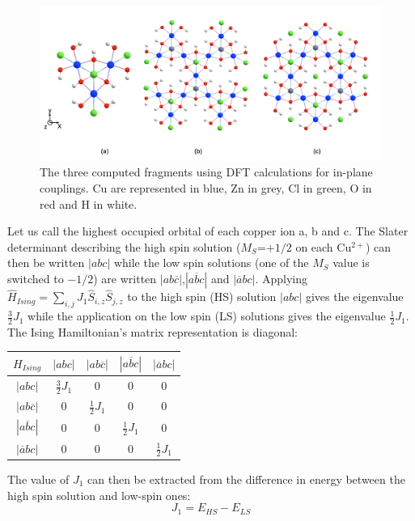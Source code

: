 \documentclass[10pt]{report}
\numberwithin{equation}{section}
\begin{document}
\begin{figure}[!ht]
    \centering
    \includegraphics[width=\textwidth]{Images/Groupir.png}
    \caption{The three computed fragments using DFT calculations for in-plane couplings. Cu are represented in blue, Zn in grey, Cl in green, O in red and H in white.}
    \label{FragmentDFT}
\end{figure}

Let us call the highest occupied orbital of each copper ion a, b and c. 
The Slater determinant describing the high spin solution ($M_S$=$+1/2$ on each Cu$^{2+}$) can then be written $|abc|$ while the low spin solutions (one of the $M_S$ value is switched to $-1/2$) are written $|ab\overline{c}|$,$|a\overline{b}c|$ and $|\overline{a}bc|$.
Applying $\hat{H}_{Ising}=\sum_{i,j}J_1 \hat{S}_{i,z}\hat{S}_{j,z}$ to the high spin (HS) solution $|abc|$ gives the eigenvalue $\frac{3}{2}J_1$ while the application on the low spin (LS) solutions gives the eigenvalue $\frac{1}{2}J_1$. 
The Ising Hamiltonian's matrix representation is diagonal:

\begin{center}
    \begin{tabular}{c | c c c c}
        $H_{Ising}$ & $|abc|$ & $|ab\overline{c}|$&$|a\overline{b}c|$ & $|\overline{a}bc|$\\
        \hline
        $|abc|$ & $\frac{3}{2}J_1$ & 0 & 0 & 0\\
        $|ab\overline{c}|$ & 0 & $\frac{1}{2}J_1 $& 0 & 0\\
        $|a\overline{b}c|$ & 0 & 0 & $\frac{1}{2}J_1 $ & 0 \\
        $|\overline{a}bc|$ & 0 & 0 & 0 & $\frac{1}{2}J_1 $
    \end{tabular}
\end{center}

The value of $J_1$ can then be extracted from the difference in energy between the high spin solution and low-spin ones:
\begin{equation}
    J_1=E_{HS}-E_{LS}
\end{equation}
\end{document}
